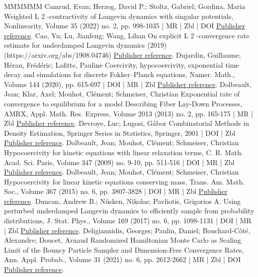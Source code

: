 \documentclass[10pt,a4paper]{article}
\numberwithin{equation}{section}
\begin{document}
\begin{thebibliography}{MMMMMM}
 Camrud, Evan; Herzog, David P.; Stoltz, Gabriel; Gordina, Maria Weighted L 2 -contractivity of Langevin dynamics with singular potentials, Nonlinearity, Volume 35 (2022) no. 2, pp. 998-1035 | MR | Zbl | DOI \href{https://ahl.centre-mersenne.org/item/AHL_2022__5__523_0/#CHSG21}{Publisher reference}.
 Cao, Yu; Lu, Jianfeng; Wang, Lihan On explicit L 2 -convergence rate estimate for underdamped Langevin dynamics (2019) (https://arxiv.org/abs/1908.04746) \href{https://ahl.centre-mersenne.org/item/AHL_2022__5__523_0/#CLW19}{Publisher reference}.
 Dujardin, Guillaume; Hérau, Frédéric; Lafitte, Pauline Coercivity, hypocoercivity, exponential time decay and simulations for discrete Fokker–Planck equations, Numer. Math., Volume 144 (2020), pp. 615-697 | DOI | MR | Zbl \href{https://ahl.centre-mersenne.org/item/AHL_2022__5__523_0/#DHL19}{Publisher reference}.
 Dolbeault, Jean; Klar, Axel; Mouhot, Clément; Schmeiser, Christian Exponential rate of convergence to equilibrium for a model Describing Fiber Lay-Down Processes, AMRX, Appl. Math. Res. Express, Volume 2013 (2013) no. 2, pp. 165-175 | MR | Zbl \href{https://ahl.centre-mersenne.org/item/AHL_2022__5__523_0/#DKMS13}{Publisher reference}.
 Devroye, Luc; Lugosi, Gábor Combinatorial Methods in Density Estimation, Springer Series in Statistics, Springer, 2001 | DOI | Zbl \href{https://ahl.centre-mersenne.org/item/AHL_2022__5__523_0/#dev2001}{Publisher reference}.
 Dolbeault, Jean; Mouhot, Clément; Schmeiser, Christian Hypocoercivity for kinetic equations with linear relaxation terms, C. R. Math. Acad. Sci. Paris, Volume 347 (2009) no. 9-10, pp. 511-516 | DOI | MR | Zbl \href{https://ahl.centre-mersenne.org/item/AHL_2022__5__523_0/#DMS09}{Publisher reference}.
 Dolbeault, Jean; Mouhot, Clément; Schmeiser, Christian Hypocoercivity for linear kinetic equations conserving mass, Trans. Am. Math. Soc., Volume 367 (2015) no. 6, pp. 3807-3828 | DOI | MR | Zbl \href{https://ahl.centre-mersenne.org/item/AHL_2022__5__523_0/#DMS15}{Publisher reference}.
 Duncan, Andrew B.; Nüsken, Nikolas; Pavliotis, Grigorios A. Using perturbed underdamped Langevin dynamics to efficiently sample from probability distributions, J. Stat. Phys., Volume 169 (2017) no. 6, pp. 1098-1131 | DOI | MR | Zbl \href{https://ahl.centre-mersenne.org/item/AHL_2022__5__523_0/#DNS17}{Publisher reference}.
 Deligiannidis, Georges; Paulin, Daniel; Bouchard-Côté, Alexandre; Doucet, Arnaud Randomized Hamiltonian Monte Carlo as Scaling Limit of the Bouncy Particle Sampler and Dimension-Free Convergence Rates, Ann. Appl. Probab., Volume 31 (2021) no. 6, pp. 2612-2662 | MR | Zbl | DOI \href{https://ahl.centre-mersenne.org/item/AHL_2022__5__523_0/#DPD18}{Publisher reference}.

\end{thebibliography}
\end{document}
